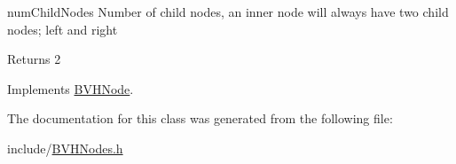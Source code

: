 num\-Child\-Nodes Number of child nodes, an inner node will always have two child nodes; left and right 

\begin{DoxyReturn}{Returns}
2 
\end{DoxyReturn}


Implements \hyperlink{classBVHNode_ae5ad50686b4c345c98d03f080afc403f}{B\-V\-H\-Node}.



The documentation for this class was generated from the following file\-:\begin{DoxyCompactItemize}
\item 
include/\hyperlink{BVHNodes_8h}{B\-V\-H\-Nodes.\-h}\end{DoxyCompactItemize}
